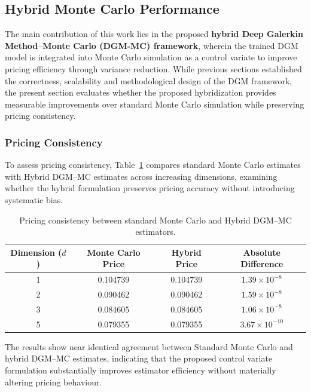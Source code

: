 \documentclass[12pt, a4paper]{article}
\begin{document}
\subsection{Hybrid Monte Carlo Performance}

The main contribution of this work lies in the proposed \textbf{hybrid
Deep Galerkin Method--Monte Carlo (DGM-MC) framework}, wherein the
trained DGM model is integrated into Monte Carlo simulation as a
control variate to improve pricing efficiency through variance
reduction. While previous sections established the correctness,
scalability and methodological design of the DGM framework, the
present section evaluates whether the proposed hybridization provides
measurable improvements over standard Monte Carlo simulation while
preserving pricing consistency.

\subsubsection{Pricing Consistency}

To assess pricing consistency, Table~\ref{tab:pricing_consistency}
compares standard Monte Carlo estimates with Hybrid DGM--MC estimates
across increasing dimensions, examining whether the hybrid formulation
preserves pricing accuracy without introducing systematic bias.

\begin{table}[h]
    \centering
    \caption{Pricing consistency between standard Monte Carlo and
    Hybrid DGM--MC estimators.}
    \label{tab:pricing_consistency}
    \begin{tabular}{|c|c|c|c|}
        \hline
        \textbf{Dimension ($d$)} & \textbf{Monte Carlo Price} &
        \textbf{Hybrid Price} & \textbf{Absolute Difference} \\
        \hline
        1 & 0.104739 & 0.104739 & $1.39 \times 10^{-8}$ \\
        2 & 0.090462 & 0.090462 & $1.59 \times 10^{-8}$ \\
        3 & 0.084605 & 0.084605 & $1.06 \times 10^{-8}$ \\
        5 & 0.079355 & 0.079355 & $3.67 \times 10^{-10}$ \\
        \hline
    \end{tabular}
\end{table}

The results show near identical agreement between Standard Monte Carlo
and hybrid DGM--MC estimates, indicating that the proposed control
variate formulation substantially improves estimator efficiency without
materially altering pricing behaviour.
\end{document}
